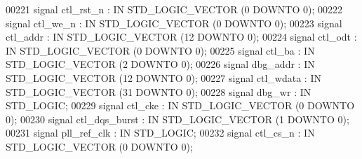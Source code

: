 \begin{DoxyCode}
00221         \textcolor{keywordflow}{signal} ctl_rst_n : \textcolor{keywordflow}{IN} \textcolor{comment}{STD\_LOGIC\_VECTOR} (\textcolor{vhdllogic}{}\textcolor{vhdllogic}{0} \textcolor{keywordflow}{DOWNTO} \textcolor{vhdllogic}{}\textcolor{vhdllogic}{0});
00222         \textcolor{keywordflow}{signal} ctl_we_n : \textcolor{keywordflow}{IN} \textcolor{comment}{STD\_LOGIC\_VECTOR} (\textcolor{vhdllogic}{}\textcolor{vhdllogic}{0} \textcolor{keywordflow}{DOWNTO} \textcolor{vhdllogic}{}\textcolor{vhdllogic}{0});
00223         \textcolor{keywordflow}{signal} ctl_addr : \textcolor{keywordflow}{IN} \textcolor{comment}{STD\_LOGIC\_VECTOR} (\textcolor{vhdllogic}{}\textcolor{vhdllogic}{12} \textcolor{keywordflow}{DOWNTO} \textcolor{vhdllogic}{}\textcolor{vhdllogic}{0});
00224         \textcolor{keywordflow}{signal} ctl_odt : \textcolor{keywordflow}{IN} \textcolor{comment}{STD\_LOGIC\_VECTOR} (\textcolor{vhdllogic}{}\textcolor{vhdllogic}{0} \textcolor{keywordflow}{DOWNTO} \textcolor{vhdllogic}{}\textcolor{vhdllogic}{0});
00225         \textcolor{keywordflow}{signal} ctl_ba : \textcolor{keywordflow}{IN} \textcolor{comment}{STD\_LOGIC\_VECTOR} (\textcolor{vhdllogic}{}\textcolor{vhdllogic}{2} \textcolor{keywordflow}{DOWNTO} \textcolor{vhdllogic}{}\textcolor{vhdllogic}{0});
00226         \textcolor{keywordflow}{signal} dbg_addr : \textcolor{keywordflow}{IN} \textcolor{comment}{STD\_LOGIC\_VECTOR} (\textcolor{vhdllogic}{}\textcolor{vhdllogic}{12} \textcolor{keywordflow}{DOWNTO} \textcolor{vhdllogic}{}\textcolor{vhdllogic}{0});
00227         \textcolor{keywordflow}{signal} ctl_wdata : \textcolor{keywordflow}{IN} \textcolor{comment}{STD\_LOGIC\_VECTOR} (\textcolor{vhdllogic}{}\textcolor{vhdllogic}{31} \textcolor{keywordflow}{DOWNTO} \textcolor{vhdllogic}{}\textcolor{vhdllogic}{0});
00228         \textcolor{keywordflow}{signal} dbg_wr : \textcolor{keywordflow}{IN} \textcolor{comment}{STD\_LOGIC};
00229         \textcolor{keywordflow}{signal} ctl_cke : \textcolor{keywordflow}{IN} \textcolor{comment}{STD\_LOGIC\_VECTOR} (\textcolor{vhdllogic}{}\textcolor{vhdllogic}{0} \textcolor{keywordflow}{DOWNTO} \textcolor{vhdllogic}{}\textcolor{vhdllogic}{0});
00230         \textcolor{keywordflow}{signal} ctl_dqs_burst : \textcolor{keywordflow}{IN} \textcolor{comment}{STD\_LOGIC\_VECTOR} (\textcolor{vhdllogic}{}\textcolor{vhdllogic}{1} \textcolor{keywordflow}{DOWNTO} \textcolor{vhdllogic}{}\textcolor{vhdllogic}{0});
00231         \textcolor{keywordflow}{signal} pll_ref_clk : \textcolor{keywordflow}{IN} \textcolor{comment}{STD\_LOGIC};
00232         \textcolor{keywordflow}{signal} ctl_cs_n : \textcolor{keywordflow}{IN} \textcolor{comment}{STD\_LOGIC\_VECTOR} (\textcolor{vhdllogic}{}\textcolor{vhdllogic}{0} \textcolor{keywordflow}{DOWNTO} \textcolor{vhdllogic}{}\textcolor{vhdllogic}{0});

\end{DoxyCode}
